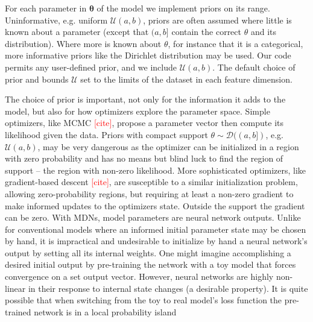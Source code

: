 \documentclass[twocolumn]{aastex631}
\newcommand{\mbs}[1]{\boldsymbol{#1}}
\newcommand{\mcal}[1]{\mathcal{#1}}
\newcommand{\TODO}[1]{{\textcolor{red}{#1}}}
\begin{document}
            For each parameter in $\mbs{\theta}$ of the model we implement
            priors on its range.  Uninformative, e.g. uniform $\mcal{U}(a, b)$,
            priors are often assumed where little is known about a parameter
            (except that $(a,b]$ contain the correct $\theta$ and its
            distribution). Where more is known about $\theta$, for instance that
            it is a categorical, more informative priors like the Dirichlet
            distribution \citep{Christopher2016} may be used.
            Our code permits any user-defined prior, and we include $\mcal{U}(a,
            b)$.  The default choice of prior and bounds $\mcal{U}$ set to the
            limits of the dataset in each feature dimension.

            The choice of prior is important, not only for the information it
            adds to the model, but also for how optimizers explore the parameter
            space. Simple optimizers, like MCMC \TODO{[cite]}, propose a
            parameter vector then compute its likelihood given the data. Priors
            with compact support  $\theta \sim \mcal{D}((a, b])$, e.g.
            $\mcal{U}(a, b)$, may be very dangerous as the optimizer can be
            initialized in a region with zero probability and has no means but
            blind luck to find the region of support -- the region with non-zero
            likelihood. More sophisticated optimizers, like gradient-based
            descent \TODO{[cite]}, are susceptible to a similar initialization
            problem, allowing zero-probability regions, but requiring at least a
            non-zero gradient to make informed updates to the optimizers state.
            Outside the  support the gradient can be zero.  With MDNs, model
            parameters are neural network outputs. Unlike for conventional
            models where an informed initial parameter state may be chosen by
            hand, it is impractical and undesirable to initialize by hand a
            neural network's output by setting all its internal weights. One
            might imagine accomplishing a desired initial output by pre-training
            the network with a toy model that forces convergence on a set output
            vector. However, neural networks are highly non-linear in their
            response to internal state changes (a desirable property). It is
            quite possible that when switching from the toy to real model's loss
            function the pre-trained network is in a local probability island
\end{document}
